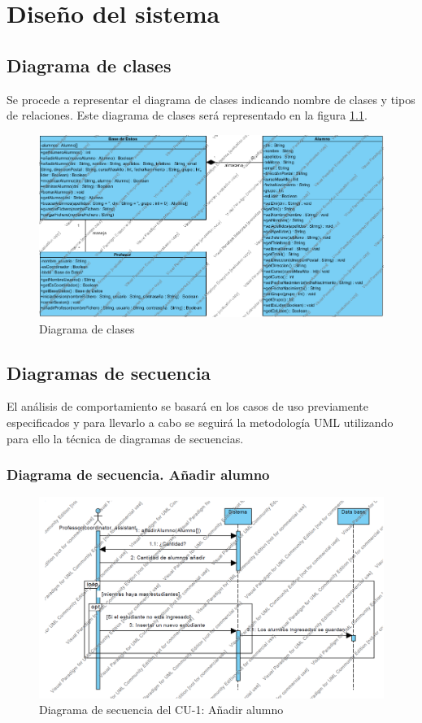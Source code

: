 \chapter{Diseño del sistema}
\section{Diagrama de clases}
Se procede a representar el diagrama de clases indicando nombre de clases y tipos de relaciones.
Este diagrama de clases será representado en la figura \ref{fig:class_diagram}.

\begin{figure}[h!]
	\centering
	\includegraphics[width=1\textwidth]{../design/class_diagram}
	\caption{Diagrama de clases}
	\label{fig:class_diagram}
\end{figure}

\newpage
\section{Diagramas de secuencia}
El análisis de comportamiento se basará en los casos de uso previamente especificados y para
llevarlo a cabo se seguirá la metodología UML utilizando para ello la técnica de diagramas de
secuencias.

\subsection{Diagrama de secuencia. Añadir alumno}
\begin{figure}[h!]
	\centering
	\includegraphics[width=1\textwidth]{../design/sd-1}
	\caption{Diagrama de secuencia del CU-1: Añadir alumno}
	\label{fig:sd001}
\end{figure}

